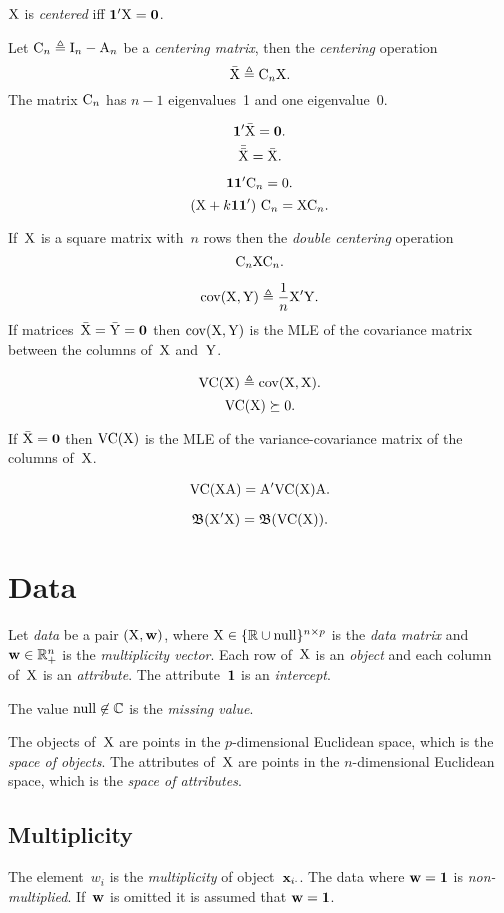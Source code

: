 \documentclass[10pt,a4paper]{article}
\theoremstyle{plain} \newtheorem{Lem}{Lemma}
\begin{document}
$\mathrm X$ is {\em centered} iff $\mathbf 1' \mathrm X = \mathbf 0$.

Let $\mathrm C_n \triangleq \mathrm I_n - \mathrm A_n$ be a {\em centering matrix}, then the {\em centering} operation
$$ \bar {\mathrm X} \triangleq \mathrm C_n \mathrm X. $$
The matrix $\mathrm C_n$ has $n-1$ eigenvalues~1 and one eigenvalue~0.

$$ \mathbf 1' \bar {\mathrm X} = \mathbf 0. $$
$$ \bar {\bar {\mathrm X}} = \bar {\mathrm X}. $$

$$ \mathbf 1 \mathbf 1' \mathrm C_n = \mathrm 0. $$
$$ (\mathrm X + k \mathbf 1 \mathbf 1') \ \mathrm C_n = \mathrm X \mathrm C_n. $$

If~$\mathrm X$ is a square matrix with~$n$ rows then the {\em double centering} operation
$$ \mathrm C_n \mathrm X \mathrm C_n. $$

$$ \mathrm {cov}(\mathrm X, \mathrm Y) \triangleq \frac 1 n \mathrm X' \mathrm Y. $$
If matrices~$\bar {\mathrm X} = \bar {\mathrm Y} = \mathbf 0$ then $\mathrm {cov}(\mathrm X, \mathrm Y)$
is the MLE of the covariance matrix between the columns of~$\mathrm X$ and~$\mathrm Y$.

$$ \mathrm {VC} (\mathrm X) \triangleq \mathrm {cov}(\mathrm X, \mathrm X). $$
$$ \mathrm {VC}(\mathrm X) \succeq 0. $$

If $\bar {\mathrm X} = \mathbf 0$ then $\mathrm {VC}(\mathrm X)$ is the MLE of the variance-covariance matrix of the columns of~$\mathrm X$.

$$ \mathrm {VC}(\mathrm X \mathrm A) = \mathrm A' \mathrm {VC} (\mathrm X) \mathrm A. $$

$$ \mathfrak B (\mathrm X' \mathrm X) = \mathfrak B (\mathrm {VC} (\mathrm X)). $$


\section{Data}
Let {\em data} be a pair $(\mathrm X, \mathbf w)$,
where $\mathrm X \in \{\mathbb R \cup \mathrm {null}\}^{n \times p}$ is the {\em data matrix} and $\mathbf w \in \mathbb R_+^n$ is the {\em multiplicity vector}.
Each row of~$\mathrm X$ is an {\em object} and each column of~$\mathrm X$ is an {\em attribute}.
The attribute~$\mathbf 1$ is an {\em intercept}.

The value $\mathrm {null} \not \in \mathbb C$ is the {\em missing value}.

The objects of~$\mathrm X$ are points in the $p$-dimensional Euclidean space, which is the {\em space of objects}.
The attributes of~$\mathrm X$ are points in the $n$-dimensional Euclidean space, which is the {\em space of attributes}.

\subsection{Multiplicity}
The element~$w_i$ is the {\em multiplicity} of object~$\mathbf x_{i\cdot}$.
The data where $\mathbf w = \mathbf 1$ is {\em non-multiplied}.
If~$\mathbf w$ is omitted it is assumed that $\mathbf w = \mathbf 1$.
\end{document}
